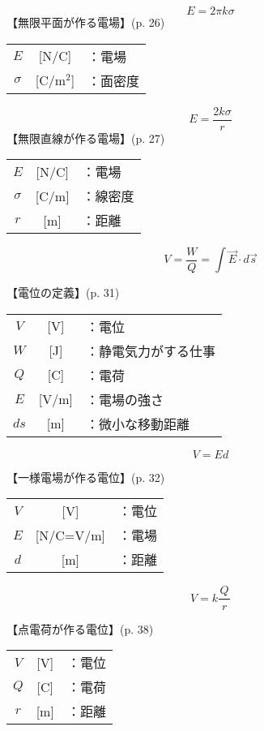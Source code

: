 \documentclass[10pt]{jarticle}
\begin{document}
\newpage
\[
E = 2 \pi k \sigma
\]
\vskip3mm
【無限平面が作る電場】{\footnotesize (p. 26)}

\begin{tabular}{ccl}
$E$	&[N/C]	&：電場 \\
$\sigma$	&[C/m$^2$]	&：面密度
\end{tabular}




\newpage
\[
E = \frac{2k \sigma}{r}
\]
\vskip3mm
【無限直線が作る電場】{\footnotesize (p. 27)}

\begin{tabular}{ccl}
$E$	&[N/C]	&：電場 \\
$\sigma$	&[C/m]	&：線密度\\
$r$	&[m]	&：距離
\end{tabular}




\newpage
\[
V = \frac{W}{Q} = \int \vec{E} \cdot d\vec{s}
\]


\vskip3mm
【電位の定義】{\footnotesize (p. 31)}

\begin{tabular}{ccl}
$V$	&[V]	&：電位 \\
$W$	&[J]	&：{\small 静電気力がする仕事} \\
$Q$	&[C]	&：電荷\\
$E$	&[V/m]	&：電場の強さ\\
$ds$	&[m]	&：微小な移動距離\\
\end{tabular}




\newpage
\[
V = E d
\]


\vskip3mm
【一様電場が作る電位】{\footnotesize (p. 32)}

\begin{tabular}{ccl}
$V$	&[V]	&：電位 \\
$E$	&[N/C=V/m]	&：電場 \\
$d$	&[m]	&：距離
\end{tabular}





\newpage
\[
V = k \frac{Q}{\; r \;}
\]


\vskip3mm
【点電荷が作る電位】{\footnotesize (p. 38)}

\begin{tabular}{ccl}
$V$	&[V]	&：電位 \\
$Q$	&[C]	&：電荷 \\
$r$	&[m]	&：距離
\end{tabular}
\end{document}
